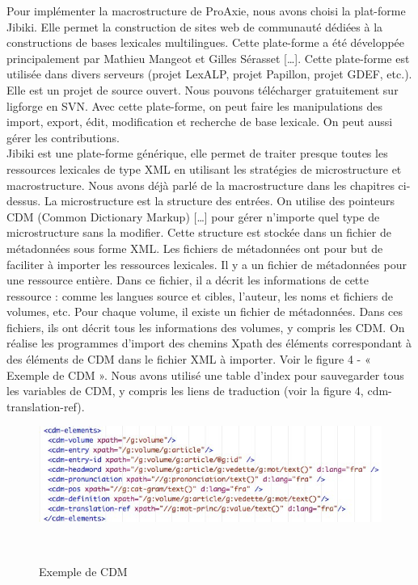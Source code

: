 \documentclass[10pt,a4paper,twoside]{article}
\begin{document}
\cite{MMCE11}
Pour implémenter la macrostructure de ProAxie, nous avons choisi la plat-forme Jibiki. Elle permet la construction de sites web de communauté dédiées à la constructions de bases lexicales multilingues. Cette plate-forme a été développée principalement par Mathieu Mangeot et Gilles Sérasset […]. Cette plate-forme est utilisée dans divers serveurs (projet LexALP, projet Papillon, projet GDEF, etc.). Elle est un projet de source ouvert. Nous pouvons télécharger gratuitement sur ligforge en SVN. Avec cette plate-forme, on peut faire les manipulations des import, export, édit, modification et recherche de base lexicale. On peut aussi gérer les contributions. \\
Jibiki est une plate-forme générique, elle permet de traiter presque toutes les ressources lexicales de type XML en utilisant les stratégies de microstructure et macrostructure. Nous avons déjà parlé de la macrostructure dans les chapitres ci-dessus. La microstructure est la structure des entrées. On utilise des pointeurs CDM (Common Dictionary Markup) […] pour gérer n’importe quel type de microstructure sans la modifier. Cette structure est stockée dans un fichier de métadonnées sous forme XML. Les fichiers de métadonnées ont pour but de faciliter à importer les ressources lexicales.  Il y a un fichier de métadonnées pour une ressource entière.  Dans ce fichier, il a décrit les informations de cette ressource : comme les langues source et cibles, l’auteur, les noms et fichiers de volumes, etc. Pour chaque volume, il existe un fichier de métadonnées. Dans ces fichiers, ils ont décrit tous les informations des volumes, y compris les CDM. On réalise les programmes d’import des chemins Xpath des éléments correspondant à des éléments de CDM dans le fichier XML à importer. Voir le figure 4 - « Exemple de CDM ». Nous avons utilisé une table d’index pour sauvegarder tous les variables de CDM, y compris les liens de traduction (voir la figure 4, cdm-translation-ref). \\
\begin{figure}[htbp] 
\begin{center} 
\includegraphics[width=14cm]{images/CDM.jpg}
\end{center} 
\caption{Exemple de CDM} \label{image} \
\end{figure}
\end{document}
